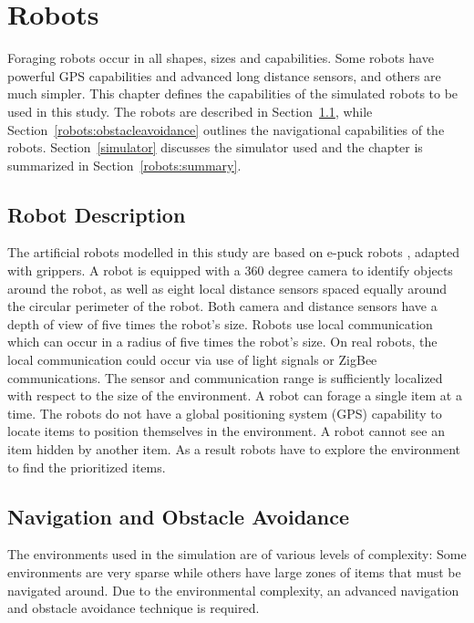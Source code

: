 
\chapter{Robots}
\label{chap:robots}

Foraging robots occur in all shapes, sizes and capabilities. Some robots have powerful GPS capabilities and advanced long distance sensors, and others are much simpler. This chapter defines the capabilities of the simulated robots to be used in this study. The robots are described in Section~\ref{robotdescription}, while Section~\ref{robots:obstacleavoidance} outlines the navigational capabilities of the robots. Section~\ref{simulator} discusses the simulator used and the chapter is summarized in Section~\ref{robots:summary}.

\section{Robot Description}
\label{robotdescription}

The artificial robots modelled in this study are based on e-puck robots \cite{mondada2009puck}, adapted with grippers. A robot is equipped with a 360 degree camera to identify objects around the robot, as well as eight local distance sensors spaced equally around the circular perimeter of the robot. Both camera and distance sensors have a depth of view of five times the robot's size. Robots use local communication which can occur in a radius of five times the robot's size. On real robots, the local communication could occur via use of light signals or ZigBee communications. The sensor and communication range is sufficiently localized with respect to the size of the environment. A robot can forage a single item at a time. The robots do not have a global positioning system (GPS) capability to locate items to position themselves in the environment. A robot cannot see an item hidden by another item. As a result robots have to explore the environment to find the prioritized items.

\section{Navigation and Obstacle Avoidance}
\label{navigationandobstacleavoidance}

The environments used in the simulation are of various levels of complexity: Some environments are very sparse while others have large zones of items that must be navigated around. Due to the environmental complexity, an advanced navigation and obstacle avoidance technique is required. 

